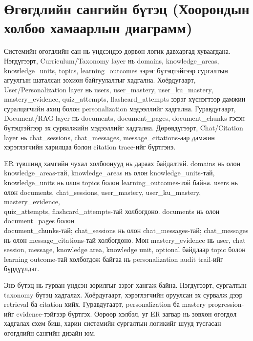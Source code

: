 \documentclass[12pt,A4]{report}
\newcommand{\eng}[1]{#1}
\begin{document}
\section{Өгөгдлийн сангийн бүтэц (Хоорондын холбоо хамаарлын диаграмм)}

Системийн өгөгдлийн сан нь үндсэндээ дөрвөн логик давхаргад хуваагдана. Нэгдүгээрт, \eng{Curriculum/Taxonomy layer} нь \eng{domains}, \eng{knowledge\_areas}, \eng{knowledge\_units}, \eng{topics}, \eng{learning\_outcomes} зэрэг бүтэцтэйгээр сургалтын агуулгын шаталсан зохион байгуулалтыг хадгална. Хоёрдугаарт, \eng{User/Personalization layer} нь \eng{users}, \eng{user\_mastery}, \eng{user\_ku\_mastery}, \eng{mastery\_evidence}, \eng{quiz\_attempts}, \eng{flashcard\_attempts} зэрэг хүснэгтээр дамжин суралцагчийн ахиц болон personalization мэдээллийг хадгална. Гуравдугаарт, \eng{Document/RAG layer} нь \eng{documents}, \eng{document\_pages}, \eng{document\_chunks} гэсэн бүтэцтэйгээр эх сурвалжийн мэдээллийг хадгална. Дөрөвдүгээрт, \eng{Chat/Citation layer} нь \eng{chat\_sessions}, \eng{chat\_messages}, \eng{message\_citations}-аар дамжин хэрэглэгчийн харилцаа болон citation trace-ийг бүртгэнэ.

\eng{ER} түвшинд хамгийн чухал холбоонууд нь дараах байдалтай. \eng{domains} нь олон \eng{knowledge\_areas}-тай, \eng{knowledge\_areas} нь олон \eng{knowledge\_units}-тай, \eng{knowledge\_units} нь олон \eng{topics} болон \eng{learning\_outcomes}-той байна. \eng{users} нь олон \eng{documents}, \eng{chat\_sessions}, \eng{user\_mastery}, \eng{user\_ku\_mastery}, \eng{mastery\_evidence}, \\ \eng{quiz\_attempts}, \eng{flashcard\_attempts}-тай холбогдоно. \eng{documents} нь олон \eng{document\_pages} болон \\ \eng{document\_chunks}-тай; \eng{chat\_sessions} нь олон \eng{chat\_messages}-тай; \eng{chat\_messages} нь олон \eng{message\_citations}-тай холбогдоно. Мөн \eng{mastery\_evidence} нь \eng{user}, \eng{chat session}, \eng{message}, \eng{knowledge area}, \eng{knowledge unit}, optional байдлаар \eng{topic} болон \eng{learning outcome}-тай холбогдож байгаа нь personalization audit trail-ийг бүрдүүлдэг.

Энэ бүтэц нь гурван үндсэн зорилгыг зэрэг хангаж байна. Нэгдүгээрт, сургалтын taxonomy бүтэц хадгалах. Хоёрдугаарт, хэрэглэгчийн оруулсан эх сурвалж дээр retrieval ба citation хийх. Гуравдугаарт, personalization ба \eng{mastery progression}-ийг evidence-тэйгээр бүртгэх. Өөрөөр хэлбэл, уг \eng{ER} загвар нь зөвхөн өгөгдөл хадгалах схем биш, харин системийн сургалтын логикийг шууд тусгасан өгөгдлийн сангийн дизайн юм.
\end{document}
